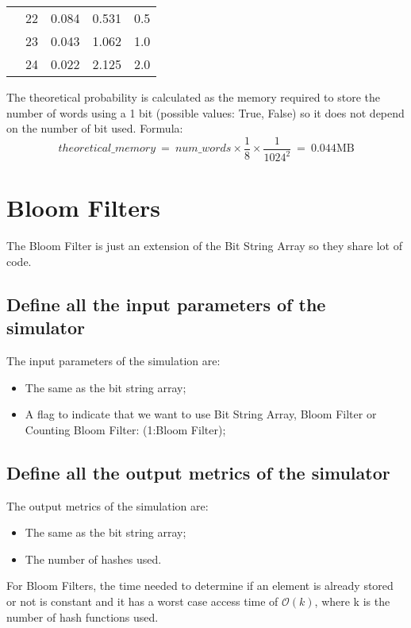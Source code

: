 \documentclass{report}
\begin{document}
{\begin{table}[h!]
\begin{tabular}{|c|c|c|c|c|}
						                                                                                     & 22 & 0.084        & 0.531 & 0.5  \\ \cline{2-5} 
						                                                                                     & 23 & 0.043        & 1.062 & 1.0  \\ \cline{2-5} 
						                                                                                     & 24 & 0.022        & 2.125 & 2.0 \\ \hline
				\end{tabular}
		\end{table}
		The theoretical probability is calculated as the memory required to store the number of words using a 1 bit (possible values: True, False) so it does not depend on the number of bit used. Formula:
		\[ theoretical\_memory \: = \: num\_words \times \frac{1}{8} \times \frac{1}{1024^2} \: = \: 0.044 \text{MB}\]
		
		
		\newpage
		
					\section{Bloom Filters}	 
	 				The Bloom Filter is just an extension of the Bit String Array so they share lot of code. 
				\subsection{Define all the input parameters of the simulator}
					The input parameters of the simulation are:
					\begin{itemize}
						\item The same as the bit string array;
						\item A flag to indicate that we want to use Bit String Array, Bloom Filter or Counting Bloom Filter: (1:Bloom Filter);
					\end{itemize}
					 
				\subsection{Define all the output metrics of the simulator}
				The output metrics of the simulation are:
				\begin{itemize}
					\item The same as the bit string array;
					\item The number of hashes used.
				\end{itemize}
			For Bloom Filters, the time needed to determine if an element is already stored or not is constant and it has a worst case access time of $\mathcal{O}(k)$, where k is the number of hash functions used.
			
}
\end{document}
